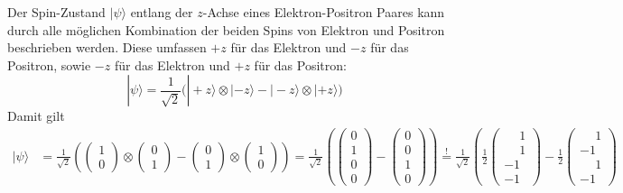 \begin{refsection}
Der Spin-Zustand $|\psi\rangle$ entlang der $z$-Achse eines 
Elektron-Positron Paares  kann durch alle m\"oglichen Kombination der beiden
Spins von Elektron und Positron beschrieben werden. 
Diese umfassen $+z$ f\"ur das Elektron und $-z$
f\"ur das Positron, sowie $-z$ f\"ur das Elektron und $+z$ f\"ur das Positron:
\begin{equation}
    |\psi\rangle = \frac{1}{\sqrt{2}} \Big( 
        |{+}z\rangle \otimes |{-}z\rangle - |{-}z\rangle \otimes |{+}z\rangle
     \Big)
\end{equation}
Damit gilt
\begin{align}
    |\psi\rangle &= \frac{1}{\sqrt{2}} 
    \left( 
        \begin{pmatrix} 1\\0 \end{pmatrix} 
        \otimes 
        \begin{pmatrix} 0\\1 \end{pmatrix}
        -
        \begin{pmatrix} 0\\1 \end{pmatrix}
        \otimes
        \begin{pmatrix} 1\\0 \end{pmatrix}
     \right)
     =
     \frac{1}{\sqrt{2}}\left(
         \begin{pmatrix} 0 \\ 1 \\ 0 \\ 0 \end{pmatrix}
         -
         \begin{pmatrix} 0 \\ 0 \\ 1 \\ 0 \end{pmatrix}
     \right)
     \stackrel{!}{=}
     \frac{1}{\sqrt{2}}\left(
         \frac{1}{2}
         \begin{pmatrix} \phantom{-}1 \\ \phantom{-}1 \\ -1 \\ -1 \end{pmatrix}
         -
         \frac{1}{2}
         \begin{pmatrix} \phantom{-}1 \\ -1 \\ \phantom{-}1 \\ -1 \end{pmatrix}

\end{align}
\end{refsection}
